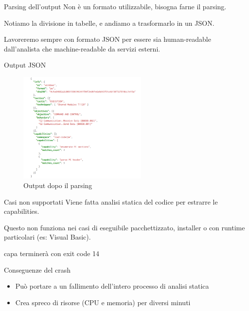\begin{frame}{Parsing dell'output}
Non è un formato utilizzabile, bisogna farne il parsing.

\vfill

Notiamo la divisione in tabelle, e andiamo a trasformarlo in un JSON.

Lavoreremo sempre con formato JSON per essere sia human-readable dall'analista che machine-readable da servizi esterni.
\end{frame}

\begin{frame}{Output JSON}
\begin{figure}
    \centering
    \includegraphics[width=0.57\textwidth]{images/capa_json_output.png}
    \caption{Output dopo il parsing}
    \label{fig:capa_json_output}
\end{figure}
\end{frame}

\begin{frame}{Casi non supportati}
Viene fatta analisi statica del codice per estrarre le capabilities.

Questo non funziona nei casi di eseguibile pacchettizzato, installer o con runtime particolari (es: Visual Basic).

capa terminerà con exit code 14
\end{frame}

\begin{frame}{Conseguenze del crash}
\begin{itemize}
    \item Può portare a un fallimento dell'intero processo di analisi statica
    \item Crea spreco di risorse (CPU e memoria) per diversi minuti
\end{itemize}
\end{frame}

